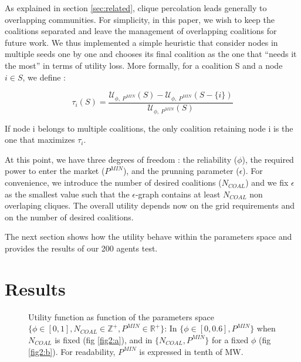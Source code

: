\documentclass[conference]{IEEEtran}
\begin{document}
As explained in section \ref{sec:related}, clique percolation leads generally to overlapping communities. For simplicity, in this paper, we wish to keep the coalitions separated and  leave the management of overlapping coalitions for future work. We thus implemented a simple heuristic that consider nodes in multiple seeds one by one and chooses its final coalition as the one that “needs it the most” in terms of utility loss. More formally, for a coalition S and a node $ i \in S $, we define :

\begin{equation}
\tau_{i}(S) = \dfrac{\mathcal{U}_{\phi,\ P^{MIN}}(S) - \mathcal{U}_{\phi,\ P^{MIN}}(S-\{i\}) }{\mathcal{U}_{\phi,\ P^{MIN}}(S)}
\label{tau}
\end{equation}

If node i belongs to  multiple coalitions, the only coalition retaining node i is the one that maximizes $ \tau_{i} $.

At this point, we have three degrees of freedom : the reliability ($ \phi $), the required power to enter the market ($P^{MIN}$), and the prunning parameter ($\epsilon$). For convenience, we introduce the number of desired coalitions ($ N_{COAL} $) and we fix $\epsilon $ as the smallest value such that the $ \epsilon $-graph contains at least $ N_{COAL} $ non overlaping cliques. The overall utility depends now on the grid requirements and on the number of desired coalitions.

The next section shows how the utility behave within the parameters space and provides the results of our 200 agents test.

\section{Results}
\label{sec:results}

\begin{figure}
 \centering
\caption{Utility function as function of the parameters space $\{\phi \in [0,1], N_{COAL}\in \mathbb{Z}^+, P^{MIN} \in \mathbb{R}^+\}$: In $ \{\phi \in [0,0.6], P^{MIN}\} $ when $ N_{COAL} $ is fixed (fig \ref{fig2:a}), and in $ \{N_{COAL}, P^{MIN}\} $ for a fixed $ \phi $ (fig \ref{fig2:b}). For readability, $ P^{MIN} $ is expressed in tenth of MW.}
\label{Fig2}
\end{figure}
\end{document}
